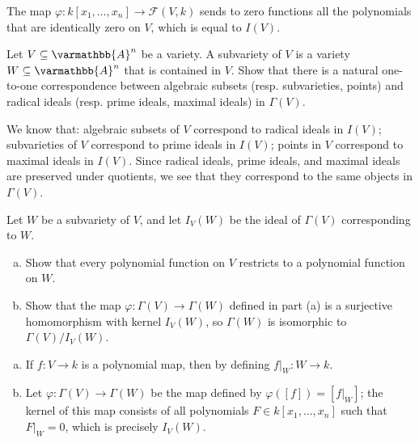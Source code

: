 \documentclass[10pt]{mypackage}
\renewcommand*{\mathbb}[1]{\varmathbb{#1}}
\newcommand{\A}{\mathbb{A}}
\begin{document}
\begin{solution}
  The map $\varphi\colon k\left[ x_1,\dots,x_n \right]\rightarrow \mathcal{F}\left( V,k \right)$ sends to zero functions all the polynomials that are identically zero on $V$, which is equal to $I(V)$.
\end{solution}
\begin{exercise}[Exercise 2.2]
  Let $V\subseteq \A^n$ be a variety. A subvariety of $V$ is a variety $W\subseteq \A^n$ that is contained in $V$. Show that there is a natural one-to-one correspondence between algebraic subsets (resp. subvarieties, points) and radical ideals (resp. prime ideals, maximal ideals) in $\Gamma\left( V \right)$.
\end{exercise}
\begin{solution}
  We know that: algebraic subsets of $V$ correspond to radical ideals in $I(V)$; subvarieties of $V$ correspond to prime ideals in $I(V)$; points in $V$ correspond to maximal ideals in $I(V)$. Since radical ideals, prime ideals, and maximal ideals are preserved under quotients, we see that they correspond to the same objects in $\Gamma(V)$.
\end{solution}
\begin{exercise}[Exercise 2.3]
  Let $W$ be a subvariety of $V$, and let $I_V(W)$ be the ideal of $\Gamma(V)$ corresponding to $W$.
  \begin{enumerate}[(a)]
    \item Show that every polynomial function on $V$ restricts to a polynomial function on $W$.
    \item Show that the map $\varphi\colon \Gamma(V)\rightarrow \Gamma(W)$ defined in part (a) is a surjective homomorphism with kernel $I_V(W)$, so $\Gamma(W)$ is isomorphic to $\Gamma(V)/I_V(W)$.
  \end{enumerate}
\end{exercise}
\begin{solution}\hfill
  \begin{enumerate}[(a)]
    \item If $f\colon V\rightarrow k$ is a polynomial map, then by defining $f|_{W}\colon W\rightarrow k$.
    \item Let $\varphi\colon \Gamma(V)\rightarrow \Gamma(W)$ be the map defined by $\varphi\left( \left[ f \right] \right) = \left[ f|_{W} \right]$; the kernel of this map consists of all polynomials $F\in k\left[ x_1,\dots,x_n \right]$ such that $F|_{W} = 0$, which is precisely $I_V(W)$.
  \end{enumerate}
\end{solution}
\end{document}
